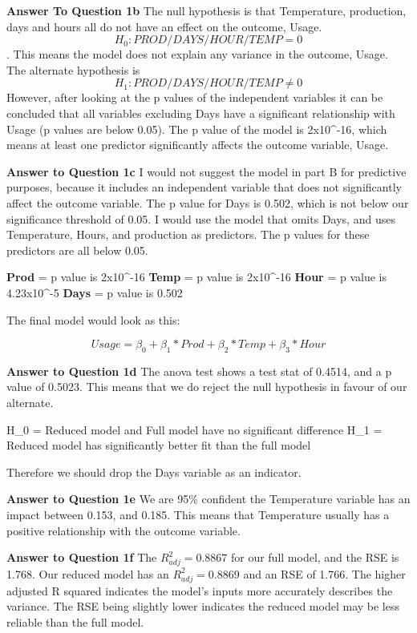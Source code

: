 \documentclass[
]{article}
\begin{document}
\textbf{Answer To Question 1b} The null hypothesis is that Temperature,
production, days and hours all do not have an effect on the outcome,
Usage.\[ H_0:PROD/DAYS/HOUR/TEMP = 0\]. This means the model does not
explain any variance in the outcome, Usage. The alternate hypothesis is
\[ H_1:PROD/DAYS/HOUR/TEMP \neq 0\] However, after looking at the p
values of the independent variables it can be concluded that all
variables excluding Days have a significant relationship with Usage (p
values are below 0.05). The p value of the model is 2x10\^{}-16, which
means at least one predictor significantly affects the outcome variable,
Usage.

\textbf{Answer to Question 1c} I would not suggest the model in part B
for predictive purposes, because it includes an independent variable
that does not significantly affect the outcome variable. The p value for
Days is 0.502, which is not below our significance threshold of 0.05. I
would use the model that omits Days, and uses Temperature, Hours, and
production as predictors. The p values for these predictors are all
below 0.05.

\textbf{Prod} = p value is 2x10\^{}-16 \textbf{Temp} = p value is
2x10\^{}-16 \textbf{Hour} = p value is 4.23x10\^{}-5 \textbf{Days} = p
value is 0.502

The final model would look as this:

\[ Usage = \beta_0+\beta_1*Prod+\beta_2*Temp+\beta_3*Hour\]

\textbf{Answer to Question 1d} The anova test shows a test stat of
0.4514, and a p value of 0.5023. This means that we do reject the null
hypothesis in favour of our alternate.

H\_0 = Reduced model and Full model have no significant difference H\_1
= Reduced model has significantly better fit than the full model

Therefore we should drop the Days variable as an indicator.

\textbf{Answer to Question 1e} We are 95\% confident the Temperature
variable has an impact between 0.153, and 0.185. This means that
Temperature usually has a positive relationship with the outcome
variable.

\textbf{Answer to Question 1f} The \(R^2_{adj} = 0.8867\) for our full
model, and the RSE is 1.768. Our reduced model has an
\(R^2_{adj} = 0.8869\) and an RSE of 1.766. The higher adjusted R
squared indicates the model's inputs more accurately describes the
variance. The RSE being slightly lower indicates the reduced model may
be less reliable than the full model.
\end{document}
